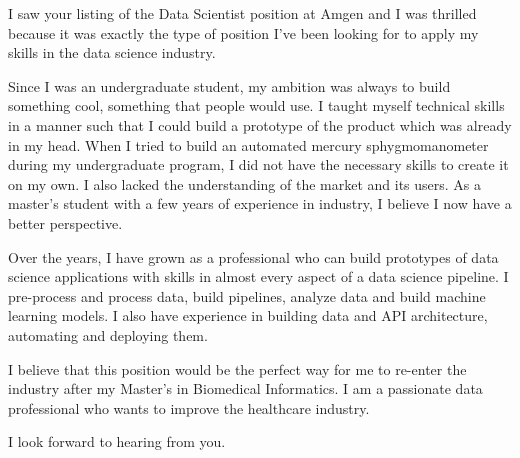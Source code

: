 I saw your listing of the Data Scientist position at Amgen and I was thrilled because it was exactly the type of position I've been looking for to apply my skills in the data science industry.

Since I was an undergraduate student, my ambition was always to build something cool, something that people would use. I taught myself technical skills in a manner such that I could build a prototype of the product which was already in my head. When I tried to build an automated mercury sphygmomanometer during my undergraduate program, I did not have the necessary skills to create it on my own. I also lacked the understanding of the market and its users. As a master's student with a few years of experience in industry, I believe I now have a better perspective.

Over the years, I have grown as a professional who can build prototypes of data science applications with skills in almost every aspect of a data science pipeline. I pre-process and process data, build pipelines, analyze data and build machine learning models. I also have experience in building data and API architecture, automating and deploying them.

I believe that this position would be the perfect way for me to re-enter the industry after my Master's in Biomedical Informatics. I am a passionate data professional who wants to improve the healthcare industry.

I look forward to hearing from you.